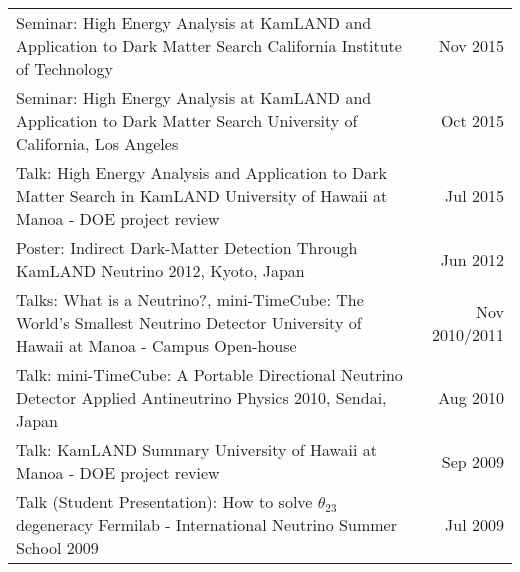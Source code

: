 \documentclass[11pt]{article} %
\begin{document}
\begin{tabularx}{\linewidth}{@{{}\textbullet\enskip}X@{\quad}r@{}}
\addlinespace[5pt]
Seminar: High Energy Analysis at KamLAND and Application to Dark Matter Search \newline California Institute of Technology & Nov 2015 \\

\addlinespace[5pt]
Seminar: High Energy Analysis at KamLAND and Application to Dark Matter Search \newline University of California, Los Angeles & Oct 2015 \\

\addlinespace[5pt]
Talk: High Energy Analysis and Application to Dark Matter Search in KamLAND \newline University of Hawaii at Manoa - DOE project review & Jul 2015 \\

\addlinespace[5pt]
Poster: Indirect Dark-Matter Detection Through KamLAND \newline Neutrino 2012, Kyoto, Japan & Jun 2012 \\

\addlinespace[5pt]
Talks: What is a Neutrino?, mini-TimeCube: The World's Smallest Neutrino Detector \newline University of Hawaii at Manoa - Campus Open-house & Nov 2010/2011 \\

\addlinespace[5pt]
Talk: mini-TimeCube: A Portable Directional Neutrino Detector \newline Applied Antineutrino Physics 2010, Sendai, Japan & Aug 2010 \\

\addlinespace[5pt]
Talk: KamLAND Summary \newline University of Hawaii at Manoa - DOE project review & Sep 2009 \\

\addlinespace[5pt]
Talk (Student Presentation): How to solve $\theta_{23}$ degeneracy \newline Fermilab - International Neutrino Summer School 2009 & Jul 2009 \\

\end{tabularx}


\clearpage
\renewcommand\refname{Publications} %
\end{document}
